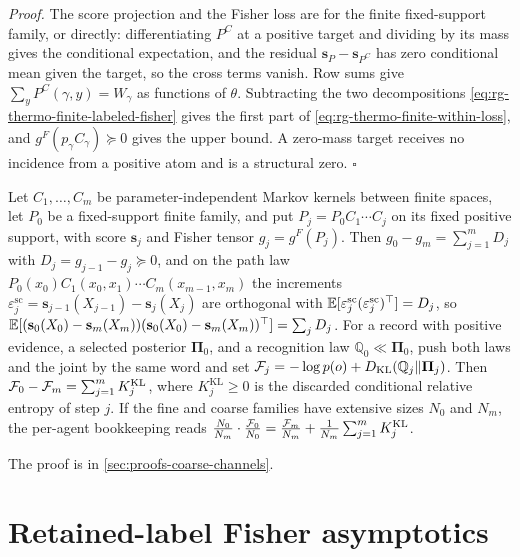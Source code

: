 \noindent\emph{Proof.}
The score projection and the Fisher loss are  for the finite
fixed-support family, or directly: differentiating $P^C$ at a positive target and dividing by its
mass gives the conditional expectation, and the residual $\mathbf s_P-\mathbf s_{P^C}$ has zero
conditional mean given the target, so the cross terms vanish. Row sums give
$\sum_yP^C(\gamma,y)=W_\gamma$ as functions of $\theta$. Subtracting the two decompositions
\eqref{eq:rg-thermo-finite-labeled-fisher} gives the first part of
\eqref{eq:rg-thermo-finite-within-loss}, and $g^F(p_\gamma C_\gamma)\succeq0$ gives the upper bound.
A zero-mass target receives no incidence from a positive atom and is a structural zero. $\square$

\label{eq:rg-thermo-account-score-telescope}
\label{eq:rg-thermo-account-vfe-telescope}
\label{eq:rg-thermo-account-vfe-area}
Let $C_1,\ldots,C_m$ be parameter-independent Markov kernels between finite spaces, let $P_0$ be a
fixed-support finite family, and put $P_j=P_0C_1\cdots C_j$ on its fixed positive support, with
score $\mathbf s_j$ and Fisher tensor $g_j=g^F(P_j)$. Then $g_0-g_m=\sum_{j=1}^mD_j$ with
$D_j=g_{j-1}-g_j\succeq0$, and on the path law $P_0(x_0)C_1(x_0,x_1)\cdots C_m(x_{m-1},x_m)$ the
increments $\varepsilon^{\mathrm{sc}}_j=\mathbf s_{j-1}(X_{j-1})-\mathbf s_j(X_j)$ are orthogonal
with $\mathbb E[\varepsilon^{\mathrm{sc}}_j(\varepsilon^{\mathrm{sc}}_j)^\top]=D_j$, so
$\mathbb E[(\mathbf s_0(X_0)-\mathbf s_m(X_m))(\mathbf s_0(X_0)-\mathbf s_m(X_m))^\top]=\sum_jD_j$. For a
record with positive evidence, a selected posterior $\boldsymbol\Pi_0$, and a recognition law
$\mathbb Q_0\ll\boldsymbol\Pi_0$, push both laws and the joint by the same word and set
$\mathcal F_j=-\log p(o)+D_{\mathrm{KL}}(\mathbb Q_j\Vert\boldsymbol\Pi_j)$. Then
$\mathcal F_0-\mathcal F_m=\sum_{j=1}^mK^{\mathrm{KL}}_j$, where $K^{\mathrm{KL}}_j\geq0$ is the
discarded conditional relative entropy of step $j$. If the fine and
coarse families have extensive sizes $N_0$ and $N_m$, the per-agent bookkeeping reads
$\tfrac{N_0}{N_m}\cdot\tfrac{\mathcal F_0}{N_0}=\tfrac{\mathcal F_m}{N_m}+\tfrac{1}{N_m}\sum_{j=1}^mK^{\mathrm{KL}}_j$.

The proof is in \cref{sec:proofs-coarse-channels}.

\section{Retained-label Fisher asymptotics}
\label{sec:cg-retained-label-asymptotics}

